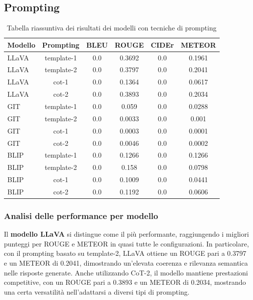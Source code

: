 \documentclass[../main.tex]{subfiles}
\begin{document}
\subsection{Prompting}

\begin{table}[H]
    \centering
    \begin{tabular}{|l|c|c|c|c|c|}
    \hline
    \textbf{Modello} &
    \textbf{Prompting} &
    \textbf{BLEU} &
    \textbf{ROUGE} &
    \textbf{CIDEr} &
    \textbf{METEOR} \\ \hline
    LLaVA & template-1 & 0.0 & 0.3692 & 0.0 & 0.1961 \\ \hline
    LLaVA & template-2 & 0.0 & 0.3797 & 0.0 & 0.2041 \\ \hline
    LLaVA & cot-1 & 0.0 & 0.1364 & 0.0 & 0.0617 \\ \hline
    LLaVA & cot-2 & 0.0 & 0.3893 & 0.0 & 0.2034 \\ \hline
    GIT & template-1 & 0.0 & 0.059 & 0.0 & 0.0288 \\ \hline
    GIT & template-2 & 0.0 & 0.0033 & 0.0 & 0.001 \\ \hline
    GIT & cot-1 & 0.0 & 0.0003 & 0.0 & 0.0001 \\ \hline
    GIT & cot-2 & 0.0 & 0.0046 & 0.0 & 0.0002 \\ \hline
    BLIP & template-1 & 0.0 & 0.1266 & 0.0 & 0.1266 \\ \hline
    BLIP & template-2 & 0.0 & 0.158 & 0.0 & 0.0798 \\ \hline
    BLIP & cot-1 & 0.0 & 0.1009 & 0.0 & 0.0441 \\ \hline
    BLIP & cot-2 & 0.0 & 0.1192 & 0.0 & 0.0606 \\ \hline
    \end{tabular}
    \caption{Tabella riassuntiva dei risultati dei modelli con tecniche di prompting}
    \label{tab:prompting}
\end{table}

\subsubsection{Analisi delle performance per modello}

Il \textbf{modello LLaVA} si distingue come il più performante, raggiungendo i migliori punteggi per ROUGE e METEOR in quasi tutte le configurazioni. In particolare, con il prompting basato su template-2, LLaVA ottiene un ROUGE pari a 0.3797 e un METEOR di 0.2041, dimostrando un'elevata coerenza e rilevanza semantica nelle risposte generate. Anche utilizzando CoT-2, il modello mantiene prestazioni competitive, con un ROUGE pari a 0.3893 e un METEOR di 0.2034, mostrando una certa versatilità nell'adattarsi a diversi tipi di prompting.
\end{document}
